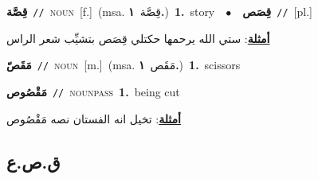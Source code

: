 \documentclass[10pt,a4paper,twoside]{article} %
\begin{document}
\begin{multicols}{2}
{\setlength\topsep{0pt}\textbf{\foreignlanguage{arabic}{قِصَّة}}\ {\color{gray}\texttt{//}\color{black}}\ \textsc{noun}\ [f.]\ \color{gray}(msa. \foreignlanguage{arabic}{قِصَّة}~\foreignlanguage{arabic}{\textbf{١.}})\color{black}\ \textbf{1.}~story\ \ $\bullet$\ \ \setlength\topsep{0pt}\textbf{\foreignlanguage{arabic}{قِصَص}}\ {\color{gray}\texttt{//}\color{black}}\ [pl.]\  \begin{flushright}\color{gray}\foreignlanguage{arabic}{\textbf{\underline{\foreignlanguage{arabic}{أمثلة}}}: ستي الله يرحمها حكتلي قِصَص بتشيِّب شعر الراس}\end{flushright}\color{black}} \vspace{2mm}

{\setlength\topsep{0pt}\textbf{\foreignlanguage{arabic}{مَقَصّ}}\ {\color{gray}\texttt{//}\color{black}}\ \textsc{noun}\ [m.]\ \color{gray}(msa. \foreignlanguage{arabic}{مَقَص}~\foreignlanguage{arabic}{\textbf{١.}})\color{black}\ \textbf{1.}~scissors\ } \vspace{2mm}

{\setlength\topsep{0pt}\textbf{\foreignlanguage{arabic}{مَقْصُوص}}\ {\color{gray}\texttt{//}\color{black}}\ \textsc{noun\textunderscore pass}\ \textbf{1.}~being cut\  \begin{flushright}\color{gray}\foreignlanguage{arabic}{\textbf{\underline{\foreignlanguage{arabic}{أمثلة}}}: تخيل انه الفستان نصه مَقْصُوص}\end{flushright}\color{black}} \vspace{2mm}

\vspace{-3mm}
\subsection*{\color{blue}\foreignlanguage{arabic}{ق.ص.ع}\color{blue}{}} 


\end{multicols}
\end{document}
